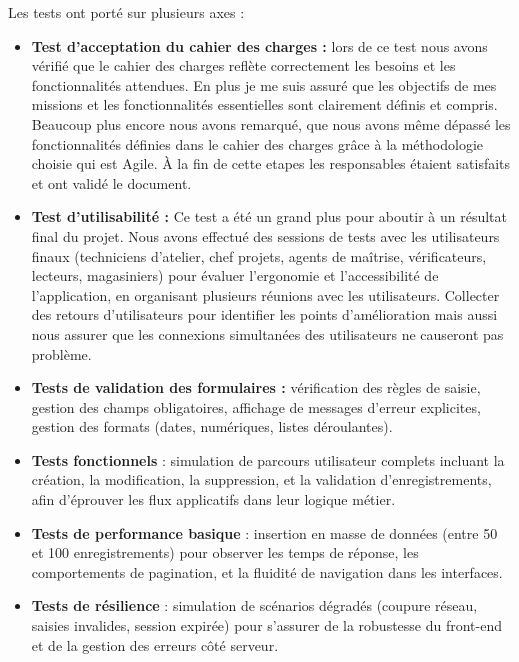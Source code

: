\documentclass[11pt,a4paper]{article}
\begin{document}
Les tests ont porté sur plusieurs axes :

\begin{itemize}

\item \textbf{Test d'acceptation du cahier des charges :} lors de ce test nous avons vérifié que le cahier des charges reflète correctement les besoins et les fonctionnalités attendues. En plus je me suis assuré que les objectifs de mes missions et les fonctionnalités essentielles sont clairement définis et compris. Beaucoup plus encore nous avons remarqué, que nous avons même dépassé les fonctionnalités définies dans le cahier des charges grâce à la  méthodologie choisie qui est Agile. À la fin de cette etapes les responsables étaient satisfaits et ont validé le document.

\item \textbf{Test d'utilisabilité : }
Ce test a été un grand plus pour aboutir à un résultat final du projet. Nous avons effectué des sessions de tests avec les utilisateurs finaux (techniciens d'atelier, chef projets, agents de maîtrise, vérificateurs, lecteurs, magasiniers) pour évaluer l'ergonomie et l'accessibilité de l'application, en organisant plusieurs réunions avec les utilisateurs. Collecter des retours d'utilisateurs pour identifier les points d'amélioration mais aussi nous assurer que les connexions simultanées des utilisateurs ne causeront pas problème.

 \item \textbf{Tests de validation des formulaires : }  vérification des règles de saisie, gestion des champs obligatoires, affichage de messages d’erreur explicites, gestion des formats (dates, numériques, listes déroulantes).
    
 \item \textbf{Tests fonctionnels} : simulation de parcours utilisateur complets incluant la création, la modification, la suppression, et la validation d’enregistrements, afin d’éprouver les flux applicatifs dans leur logique métier.
    
    \item \textbf{Tests de performance basique} : insertion en masse de données (entre 50 et 100 enregistrements) pour observer les temps de réponse, les comportements de pagination, et la fluidité de navigation dans les interfaces.
    
    \item \textbf{Tests de résilience} : simulation de scénarios dégradés (coupure réseau, saisies invalides, session expirée) pour s’assurer de la robustesse du front-end et de la gestion des erreurs côté serveur.
\end{itemize}
\end{document}
